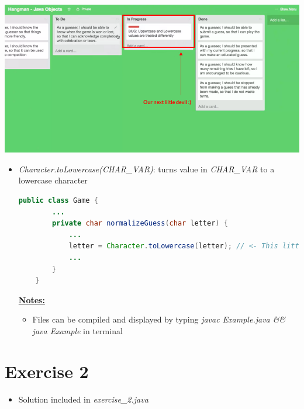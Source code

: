 \documentclass[12pt]{article}
\begin{document}
\begin{center}
\includegraphics[width=\linewidth]{images/part_4_notes_2.png}
\end{center}

\begin{itemize}
    \item \textit{Character.toLowercase(CHAR\_VAR)}: turns value in \textit{CHAR\_VAR}
    to a lowercase character


    \begin{lstlisting}[language=Java,caption={lesson\_02/Game.java}]
    public class Game {
        ...
        private char normalizeGuess(char letter) {
            ...
            letter = Character.toLowercase(letter); // <- This little guy here :)
            ...
        }
    }
    \end{lstlisting}

    \bigskip

    \underline{\textbf{Notes:}}

    \bigskip

    \begin{itemize}
        \item Files can be compiled and displayed by typing \textit{javac Example.java \&\& java Example}
        in terminal
    \end{itemize}
\end{itemize}

\bigskip

\section{Exercise 2}

\bigskip

\begin{itemize}
    \item Solution included in \textit{exercise\_2.java}
\end{itemize}
\end{document}
